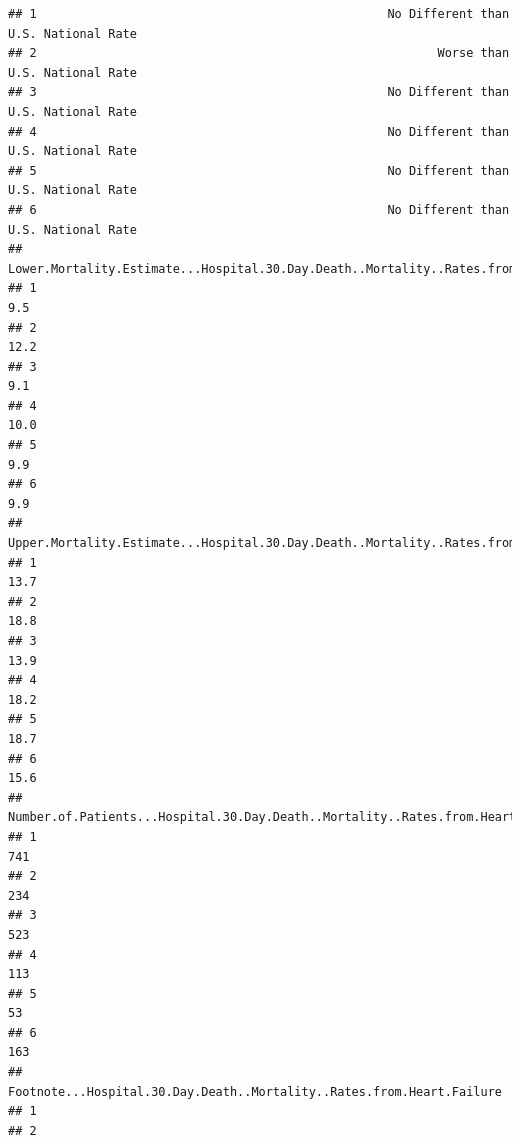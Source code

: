 \documentclass[
]{article}
\begin{document}
\begin{verbatim}
## 1                                                 No Different than U.S. National Rate
## 2                                                        Worse than U.S. National Rate
## 3                                                 No Different than U.S. National Rate
## 4                                                 No Different than U.S. National Rate
## 5                                                 No Different than U.S. National Rate
## 6                                                 No Different than U.S. National Rate
##   Lower.Mortality.Estimate...Hospital.30.Day.Death..Mortality..Rates.from.Heart.Failure
## 1                                                                                   9.5
## 2                                                                                  12.2
## 3                                                                                   9.1
## 4                                                                                  10.0
## 5                                                                                   9.9
## 6                                                                                   9.9
##   Upper.Mortality.Estimate...Hospital.30.Day.Death..Mortality..Rates.from.Heart.Failure
## 1                                                                                  13.7
## 2                                                                                  18.8
## 3                                                                                  13.9
## 4                                                                                  18.2
## 5                                                                                  18.7
## 6                                                                                  15.6
##   Number.of.Patients...Hospital.30.Day.Death..Mortality..Rates.from.Heart.Failure
## 1                                                                             741
## 2                                                                             234
## 3                                                                             523
## 4                                                                             113
## 5                                                                              53
## 6                                                                             163
##   Footnote...Hospital.30.Day.Death..Mortality..Rates.from.Heart.Failure
## 1                                                                      
## 2                                                                      

\end{verbatim}
\end{document}
